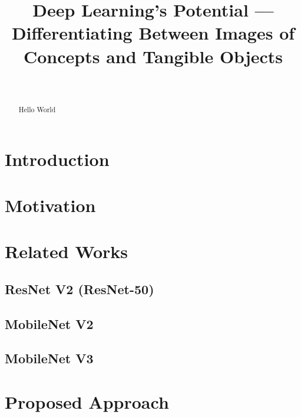 \documentclass[conference]{IEEEtran}
\title{Deep Learning’s Potential --- Differentiating Between Images of Concepts
and Tangible Objects}
\author{%
    \IEEEauthorblockN{Pratik Bhusal}
    \IEEEauthorblockA{%
        pratik.bhusal@utdallas.edu\\
        \today
    }\\

    \IEEEauthorblockN{Max Xie}
    \IEEEauthorblockA{%
        max.xie@utdallas.edu\\
        \today
    }
}
\begin{document}
\maketitle



\begin{abstract} %


Hello World
\end{abstract} %



\section{Introduction} %






\section{Motivation} %




\section{Related Works} %


\subsection{ResNet V2 (ResNet-50)}


\subsection{MobileNet V2}


\subsection{MobileNet V3}





\section{Proposed Approach} %
\end{document}
